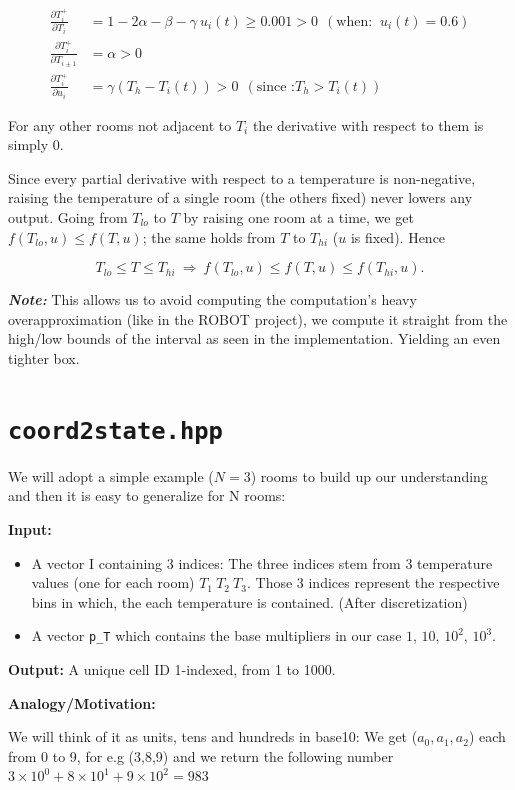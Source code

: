 \documentclass[11pt,a4paper]{article}
\begin{document}
\begin{align*}
\frac{\partial T_i^+}{\partial T_i} &= 1 - 2\alpha - \beta - \gamma \ u_i(t) \ge 0.001 > 0 \ \ (\text{when: } \ u_i(t) = 0.6)\\
\frac{\partial T_i^+}{\partial T_{i\pm1}} &= \alpha > 0\\
\frac{\partial T_i^+}{\partial u_i} &= \gamma(T_h - T_i(t)) > 0 \ \ (\text{since :} T_h > T_i(t))
\end{align*}

For any other rooms not adjacent to $T_i$ the derivative with respect to them is simply 0.

Since every partial derivative with respect to a temperature is non-negative, raising the temperature of a single room (the others fixed) never lowers any output. Going from $T_{lo}$ to $T$ by raising one room at a time, we get $f(T_{lo},u)\le f(T,u)$; the same holds from $T$ to $T_{hi}$ ($u$ is fixed). Hence

\[
T_{lo}\le T\le T_{hi}\ \Longrightarrow\ f(T_{lo},u)\le f(T,u)\le f(T_{hi},u).
\]

\textbf{\emph{Note:}} This allows us to avoid computing the computation's heavy overapproximation (like in the ROBOT project), we compute it straight from the high/low bounds of the interval as seen in the implementation. Yielding an even tighter box.

\section{\texttt{coord2state.hpp}}
We will adopt a simple example ($N = 3$) rooms to build up our understanding and then it is easy to generalize for N rooms:

\textbf{Input:}
\begin{itemize}
  \item A vector I containing $3$ indices: The three indices stem from $3$ temperature values (one for each room) $T_1 \ T_2  \ T_3$. Those 3 indices represent the respective bins in which, the each temperature is contained. (After discretization)
  \item A vector \texttt{p\_T} which contains the base multipliers in our case $1$, $10$, $10^2$, $10^3$.
\end{itemize}

\textbf{Output:} A unique cell ID 1-indexed, from 1 to 1000.

\textbf{Analogy/Motivation:}

We will think of it as units, tens and hundreds in base10: We get ($a_0,a_1,a_2$) each from 0 to 9, for e.g (3,8,9) and we return the following number $3\times 10^0 + 8\times 10^1 + 9\times 10^2 = 983$
\end{document}
